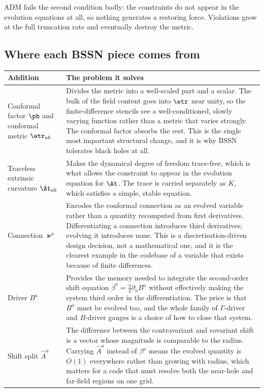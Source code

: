 ADM fails the second condition badly: the constraints do not appear in the
evolution equations at all, so nothing generates a restoring force. Violations
grow at the full truncation rate and eventually destroy the metric.

\subsection{Where each BSSN piece comes from}

\begin{longtable}{@{}p{3.4cm}p{12.2cm}@{}}
\toprule
\textbf{Addition} & \textbf{The problem it solves} \\
\midrule
\endhead
Conformal factor $\ph$ and conformal metric $\etr_{ab}$ &
Divides the metric into a well-scaled part and a scalar. The bulk of the
field content goes into $\etr$ near unity, so the finite-difference stencils
see a well-conditioned, slowly varying function rather than a metric that
varies strongly. The conformal factor absorbs the rest. This is the single
most important structural change, and it is why BSSN tolerates black holes at
all. \\

Traceless extrinsic curvature $\At_{ab}$ &
Makes the dynamical degree of freedom trace-free, which is what allows the
constraint to appear in the evolution equation for $\At$. The trace is carried
separately as $K$, which satisfies a simple, stable equation. \\

Connection $\Gt^a$ &
Encodes the conformal connection as an evolved variable rather than a quantity
recomputed from first derivatives. Differentiating a connection introduces
third derivatives; evolving it introduces none. This is a
discretisation-driven design decision, not a mathematical one, and it is the
clearest example in the codebase of a variable that exists because of
finite differences. \\

Driver $B^a$ &
Provides the memory needed to integrate the second-order shift equation
$\ddot\beta^a = \tfrac34\partial_a B^a$ without effectively making the system
third order in the differentiation. The price is that $B^a$ must be evolved
too, and the whole family of $\Gamma$-driver and $B$-driver gauges is a choice
of how to close that system. \\

Shift split $\hat{A}^a$ &
The difference between the contravariant and covariant shift is a vector whose
magnitude is comparable to the radius. Carrying $\hat{A}^a$ instead of
$\beta^a$ means the evolved quantity is $O(1)$ everywhere rather than growing
with radius, which matters for a code that must resolve both the near-hole and
far-field regions on one grid. \\
\bottomrule
\end{longtable}

